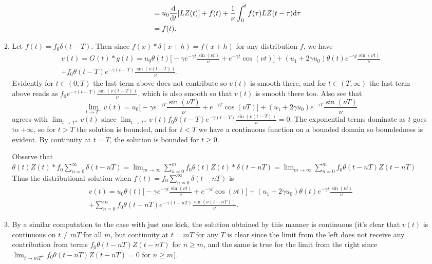 \documentclass[11pt]{article}
\begin{document}
\begin{enumerate}
\begin{enumerate}[label=(\roman*)]
\begin{enumerate}[label=(\alph*)]
\begin{align*}
                &= u_0\dv t [LZ(t)] + f(t) + \frac{1}{\nu}\int_0^t f(\tau)LZ(t-\tau)\dd \tau\\
                &= f(t).
            \end{align*}
        \end{enumerate}
        \item Let $f(t) = f_0\delta(t-T)$. Then since $f(x)\ast\delta(x+h) = f(x+h)$ for any distribution $f$, we have
        \begin{multline*}
            v(t) = G(t)\ast g(t) = u_0\theta(t)\bigg[-\gamma e^{-\gamma t}\frac{\sin(\nu t)}{\nu} + e^{-\gamma t}\cos(\nu t)\bigg] + (u_1 + 2\gamma u_0)\theta(t)e^{-\gamma t}\frac{\sin(\nu t)}{\nu}\\ + f_0\theta(t-T)e^{-\gamma (t-T)}\frac{\sin(\nu (t-T))}{\nu}. 
        \end{multline*} Evidently for $t\in (0,T)$ the last term above does not contribute so $v(t)$ is smooth there, and for $t\in (T,\infty)$ the last term above reads as $f_0e^{-\gamma (t-T)}\frac{\sin(\nu (t-T))}{\nu}$, which is also smooth so that $v(t)$ is smooth there too. Also see that 
        \[\lim_{t\to T^-}v(t) = u_0\bigg[-\gamma e^{-\gamma T}\frac{\sin(\nu T)}{\nu} + e^{-\gamma T}\cos(\nu T)\bigg] + (u_1 + 2\gamma u_0)e^{-\gamma T}\frac{\sin(\nu T)}{\nu}\] agrees with $\lim_{t\to T^+}v(t)$ since $\lim_{t\to T^+}v(t)f_0\theta(t-T)e^{-\gamma (t-T)}\frac{\sin(\nu (t-T))}{\nu} = 0$. The exponential terms dominate as $t$ goes to $+\infty$, so for $t>T$ the solution is bounded, and for $t<T$ we have a continuous function on a bounded domain so boundedness is evident. By continuity at $t = T$, the solution is bounded for $t\geq 0$.

        Observe that $\theta(t)Z(t)\ast f_0\sum_{n=0}^\infty\delta(t-nT) = \lim_{m\to\infty} \sum_{n=0}^m f_0 \theta(t)Z(t)\ast\delta(t-nT) = \lim_{m\to\infty} \sum_{n=0}^m f_0 \theta(t-nT)Z(t-nT)$ Thus the distributional solution when $f(t) = f_0\sum_{n=0}^\infty\delta(t-nT)$ is 
        \begin{multline*}
            v(t) = u_0\theta(t)\bigg[-\gamma e^{-\gamma t}\frac{\sin(\nu t)}{\nu} + e^{-\gamma t}\cos(\nu t)\bigg] + (u_1 + 2\gamma u_0)\theta(t)e^{-\gamma t}\frac{\sin(\nu t)}{\nu} \\ + \sum_{n=0}^\infty f_0 \theta(t-nT)e^{-\gamma (t-nT)}\frac{\sin(\nu (t-nT))}{\nu}.
        \end{multline*}
        \item By a similar computation to the case with just one kick, the solution obtained by this manner is continuous (it's clear that $v(t)$ is continuous on $t\neq mT$ for all $m$, but continuity at $t = mT$ for any $T$ is clear since the limit from the left does not receive any contribution from terms $f_0 \theta(t-nT)Z(t-nT)$ for $n\geq m$, and the same is true for the limit from the right since $\lim_{t\to mT^+}f_0 \theta(t-nT)Z(t-nT) = 0$ for $n\geq m$).
        

\end{enumerate}
\end{enumerate}
\end{document}
